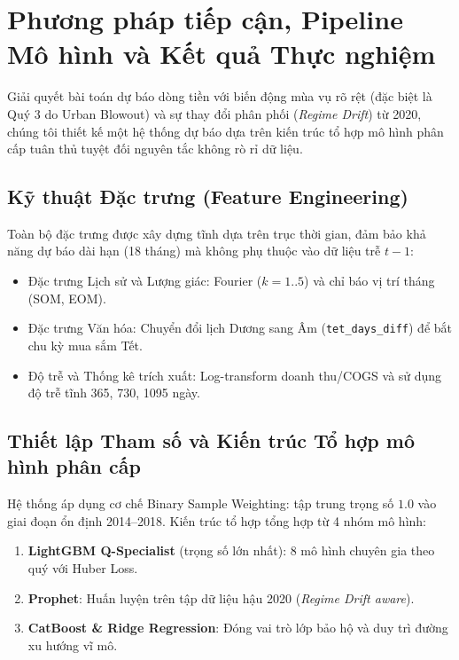 \documentclass{article}
\begin{document}
\section{Phương pháp tiếp cận, Pipeline Mô hình và Kết quả Thực nghiệm}

Giải quyết bài toán dự báo dòng tiền với biến động mùa vụ rõ rệt (đặc biệt là Quý 3 do Urban Blowout) và sự thay đổi phân phối (\textit{Regime Drift}) từ 2020, chúng tôi thiết kế một hệ thống dự báo dựa trên kiến trúc tổ hợp mô hình phân cấp tuân thủ tuyệt đối nguyên tắc không rò rỉ dữ liệu.

\subsection{Kỹ thuật Đặc trưng (Feature Engineering)}

Toàn bộ đặc trưng được xây dựng tĩnh dựa trên trục thời gian, đảm bảo khả năng dự báo dài hạn (18 tháng) mà không phụ thuộc vào dữ liệu trễ $t-1$:
\begin{itemize}[leftmargin=*, noitemsep, topsep=2pt]
    \item Đặc trưng Lịch sử và Lượng giác: Fourier ($k=1..5$) và chỉ báo vị trí tháng (SOM, EOM).
    \item Đặc trưng Văn hóa: Chuyển đổi lịch Dương sang Âm (\texttt{tet\_days\_diff}) để bắt chu kỳ mua sắm Tết.
    \item Độ trễ và Thống kê trích xuất: Log-transform doanh thu/COGS và sử dụng độ trễ tĩnh 365, 730, 1095 ngày.
\end{itemize}

\subsection{Thiết lập Tham số và Kiến trúc Tổ hợp mô hình phân cấp}

Hệ thống áp dụng cơ chế Binary Sample Weighting: tập trung trọng số $1.0$ vào giai đoạn ổn định 2014--2018. Kiến trúc tổ hợp tổng hợp từ 4 nhóm mô hình:
\begin{enumerate}[leftmargin=*, nosep, topsep=1pt]
    \item \textbf{LightGBM Q-Specialist} (trọng số lớn nhất): 8 mô hình chuyên gia theo quý với Huber Loss.
    \item \textbf{Prophet}: Huấn luyện trên tập dữ liệu hậu 2020 (\textit{Regime Drift aware}).
    \item \textbf{CatBoost \& Ridge Regression}: Đóng vai trò lớp bảo hộ và duy trì đường xu hướng vĩ mô.
\end{enumerate}
\end{document}
